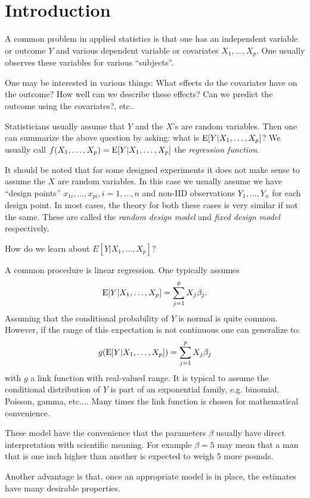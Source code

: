 \chapter{Introduction}
A common problem in applied statistics is that one has an independent
variable or outcome $Y$ and various dependent variable or covariates 
$X_1,\dots,X_p$. One usually observes these variables for various
``subjects''. 

One may be interested in various things: What effects do the
covariates have on the outcome? How well can we describe these
effects? Can we predict the outcome using the
covariates?, etc..  

Statisticians usually assume that $Y$ and the $X$'s are random
variables. Then one can summarize the above question by asking: what
is $\mbox{E}[ Y | X_1,\dots,X_p]$? We usually call $f(X_1,\dots,X_p) = \mbox{E}[Y
| X_1,\dots, X_p]$ the {\it regression function}. 

It should be noted that for some designed experiments it does not make
sense to assume the $X$ are random variables. In this case we usually
assume we have ``design points'' $x_{1i}, \dots, x_{pi}, i=1,\dots,n$
and non-IID observations $Y_1,\dots,Y_n$ for each design
point. In most cases, the
theory for both these cases is very similar if not the same. These are
called the {\it random design model} and {\it fixed design model} respectively.

How do we learn about $E[Y|X_1,\dots,X_p]$?

A common procedure is linear regression. One typically assumes
\[
\mbox{E}[Y | X_1, \dots, X_p] = \sum_{j=1}^p X_j \beta_j.
\]
Assuming that the conditional probability of $Y$ is normal is quite
common. However, if the range of this expectation is not continuous one can 
generalize to: 
\[
g ( \mbox{E}[Y | X_1, \dots, X_p] ) = \sum_{j=1}^p X_j \beta_j
\]
with $g$ a link function with real-valued range. It is typical to
assume the conditional distribution of $Y$  is part of an exponential
family, e.g. binomial, Poisson, gamma, etc.... Many times the link
function is chosen for mathematical convenience.

These model have the convenience that the parameters $\beta$ usually
have direct interpretation with scientific meaning. For example
$\beta=5$ may mean that a man that is one inch higher than another is
expected to weigh 5 more pounds.

Another advantage is that, once an appropriate model is in place, the
estimates have many desirable properties.


